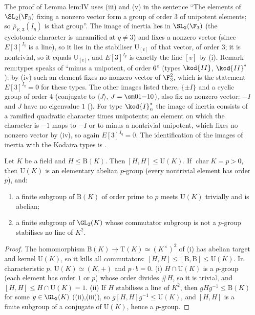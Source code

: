 \begin{paperlink}
The proof of Lemma lem:IV uses (iii) and (v) in the sentence ``The elements of $\SL_2(\F_3)$ fixing a nonzero vector form a group of
order $3$ of unipotent elements; so $\bar\rho_{E,3}(I_q)$ is that group''. The image of inertia lies in $\SL_2(\F_3)$ (the cyclotomic character is unramified at
$q\ne3$) and fixes a nonzero vector (since $E[3]^{I_q}$ is a line), so it lies in the stabiliser $\mathrm U_{[v]}$ of that vector, of order $3$; it is nontrivial, so it
equals $\mathrm U_{[v]}$, and $E[3]^{I_q}$ is exactly the line $[v]$ by (i). Remark rem:types speaks of ``minus a unipotent, of order $6$''
(types $\kod{II}$, $\kod{II}^*$): by (iv) such an element fixes no nonzero vector of $\F_3^2$, which is the statement $E[3]^{I_q}=0$ for these
types. The other images listed there, $\{\pm I\}$ and a cyclic group of order $4$ (conjugate to $\langle J\rangle$, $J=\sm01{-1}0$), also fix no nonzero vector: $-I$ and $J$ have no
eigenvalue $1$ (). For type $\kod{I}_n^*$ the image of inertia consists of a ramified quadratic character times
unipotents; an element on which the character is $-1$ maps to $-I$ or to minus a nontrivial unipotent, which fixes no nonzero vector by
(iv), so again $E[3]^{I_q}=0$. The identification of the images of inertia with the Kodaira types is .
\end{paperlink}

\begin{lemma}\label{lem:groups:borelcommutator}
Let $K$ be a field and $H\le\mathrm B(K)$. Then $[H,H]\le\mathrm U(K)$. If $\operatorname{char}K=p>0$, then $\mathrm U(K)$ is an elementary abelian $p$-group (every nontrivial element
has order $p$), and:
\begin{enumerate}[label=(\roman*)]
\item a finite subgroup of $\mathrm B(K)$ of order prime to $p$ meets $\mathrm U(K)$ trivially and is abelian;
\item a finite subgroup of $\GL_2(K)$ whose commutator subgroup is not a $p$-group stabilises no line of $K^2$.
\end{enumerate}
\end{lemma}

\begin{proof}
The homomorphism $\mathrm B(K)\to\mathrm T(K)\simeq(K^\times)^2$ of (i) has abelian target and kernel $\mathrm U(K)$, so it kills all commutators:
$[H,H]\le[\mathrm B,\mathrm B]\le\mathrm U(K)$. In characteristic $p$, $\mathrm U(K)\simeq(K,+)$ and $p\cdot b=0$. (i) $H\cap\mathrm U(K)$ is a $p$-group (each element has order $1$ or $p$)
whose order divides $\#H$, so it is trivial, and $[H,H]\le H\cap\mathrm U(K)=1$. (ii) If $H$ stabilises a line of $K^2$, then $gHg^{-1}\le\mathrm B(K)$ for some $g\in\GL_2(K)$
((ii),(iii)), so $g[H,H]g^{-1}\le\mathrm U(K)$, and $[H,H]$ is a finite subgroup of a conjugate of $\mathrm U(K)$, hence a $p$-group.
\end{proof}

